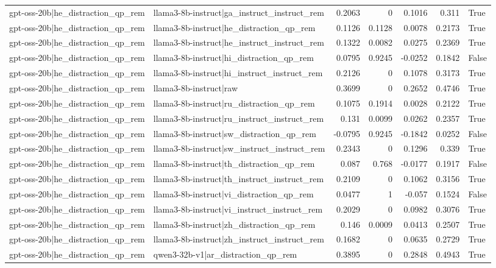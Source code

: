 \begin{table}
\begin{tabular}{l l r r r r l}
gpt-oss-20b|he_distraction_qp_rem & llama3-8b-instruct|ga_instruct_instruct_rem & 0.2063 & 0 & 0.1016 & 0.311 & True \\
gpt-oss-20b|he_distraction_qp_rem & llama3-8b-instruct|he_distraction_qp_rem & 0.1126 & 0.1128 & 0.0078 & 0.2173 & True \\
gpt-oss-20b|he_distraction_qp_rem & llama3-8b-instruct|he_instruct_instruct_rem & 0.1322 & 0.0082 & 0.0275 & 0.2369 & True \\
gpt-oss-20b|he_distraction_qp_rem & llama3-8b-instruct|hi_distraction_qp_rem & 0.0795 & 0.9245 & -0.0252 & 0.1842 & False \\
gpt-oss-20b|he_distraction_qp_rem & llama3-8b-instruct|hi_instruct_instruct_rem & 0.2126 & 0 & 0.1078 & 0.3173 & True \\
gpt-oss-20b|he_distraction_qp_rem & llama3-8b-instruct|raw & 0.3699 & 0 & 0.2652 & 0.4746 & True \\
gpt-oss-20b|he_distraction_qp_rem & llama3-8b-instruct|ru_distraction_qp_rem & 0.1075 & 0.1914 & 0.0028 & 0.2122 & True \\
gpt-oss-20b|he_distraction_qp_rem & llama3-8b-instruct|ru_instruct_instruct_rem & 0.131 & 0.0099 & 0.0262 & 0.2357 & True \\
gpt-oss-20b|he_distraction_qp_rem & llama3-8b-instruct|sw_distraction_qp_rem & -0.0795 & 0.9245 & -0.1842 & 0.0252 & False \\
gpt-oss-20b|he_distraction_qp_rem & llama3-8b-instruct|sw_instruct_instruct_rem & 0.2343 & 0 & 0.1296 & 0.339 & True \\
gpt-oss-20b|he_distraction_qp_rem & llama3-8b-instruct|th_distraction_qp_rem & 0.087 & 0.768 & -0.0177 & 0.1917 & False \\
gpt-oss-20b|he_distraction_qp_rem & llama3-8b-instruct|th_instruct_instruct_rem & 0.2109 & 0 & 0.1062 & 0.3156 & True \\
gpt-oss-20b|he_distraction_qp_rem & llama3-8b-instruct|vi_distraction_qp_rem & 0.0477 & 1 & -0.057 & 0.1524 & False \\
gpt-oss-20b|he_distraction_qp_rem & llama3-8b-instruct|vi_instruct_instruct_rem & 0.2029 & 0 & 0.0982 & 0.3076 & True \\
gpt-oss-20b|he_distraction_qp_rem & llama3-8b-instruct|zh_distraction_qp_rem & 0.146 & 0.0009 & 0.0413 & 0.2507 & True \\
gpt-oss-20b|he_distraction_qp_rem & llama3-8b-instruct|zh_instruct_instruct_rem & 0.1682 & 0 & 0.0635 & 0.2729 & True \\
gpt-oss-20b|he_distraction_qp_rem & qwen3-32b-v1|ar_distraction_qp_rem & 0.3895 & 0 & 0.2848 & 0.4943 & True \\

\end{tabular}
\end{table}
